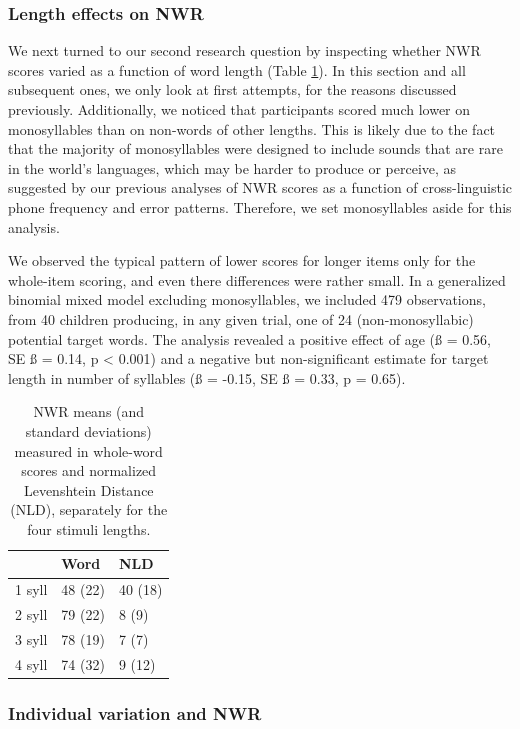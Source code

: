 \documentclass[
  american,
  ,man,floatsintext]{apa6}
\begin{document}
\hypertarget{length-effects-on-nwr-1}{%
\subsubsection{Length effects on NWR}\label{length-effects-on-nwr-1}}

We next turned to our second research question by inspecting whether NWR scores varied as a function of word length (Table \ref{tab:tablength}). In this section and all subsequent ones, we only look at first attempts, for the reasons discussed previously. Additionally, we noticed that participants scored much lower on monosyllables than on non-words of other lengths. This is likely due to the fact that the majority of monosyllables were designed to include sounds that are rare in the world's languages, which may be harder to produce or perceive, as suggested by our previous analyses of NWR scores as a function of cross-linguistic phone frequency and error patterns. Therefore, we set monosyllables aside for this analysis.

We observed the typical pattern of lower scores for longer items only for the whole-item scoring, and even there differences were rather small. In a generalized binomial mixed model excluding monosyllables, we included 479 observations, from 40 children producing, in any given trial, one of 24 (non-monosyllabic) potential target words. The analysis revealed a positive effect of age (ß = 0.56, SE ß = 0.14, p \textless{} 0.001) and a negative but non-significant estimate for target length in number of syllables (ß = -0.15, SE ß = 0.33, p = 0.65).

\begin{table}

\caption{\label{tab:tablength}NWR means (and standard deviations) measured in whole-word scores and normalized Levenshtein Distance (NLD), separately for the four stimuli lengths.}
\centering
\begin{tabular}[t]{lll}
\toprule
  & Word & NLD\\
\midrule
1 syll & 48 (22) & 40 (18)\\
2 syll & 79 (22) & 8 (9)\\
3 syll & 78 (19) & 7 (7)\\
4 syll & 74 (32) & 9 (12)\\
\bottomrule
\end{tabular}
\end{table}

\hypertarget{individual-variation-and-nwr}{%
\subsubsection{Individual variation and NWR}\label{individual-variation-and-nwr}}
\end{document}
